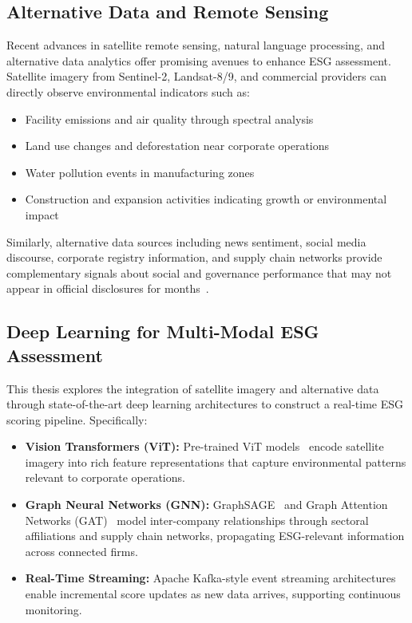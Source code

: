 \subsection{Alternative Data and Remote Sensing}

Recent advances in satellite remote sensing, natural language processing, and alternative data analytics offer promising avenues to enhance ESG assessment. Satellite imagery from Sentinel-2, Landsat-8/9, and commercial providers can directly observe environmental indicators such as:

\begin{itemize}
\item Facility emissions and air quality through spectral analysis
\item Land use changes and deforestation near corporate operations
\item Water pollution events in manufacturing zones
\item Construction and expansion activities indicating growth or environmental impact
\end{itemize}

Similarly, alternative data sources including news sentiment, social media discourse, corporate registry information, and supply chain networks provide complementary signals about social and governance performance that may not appear in official disclosures for months~\cite{li2020alternative}.

\subsection{Deep Learning for Multi-Modal ESG Assessment}

This thesis explores the integration of satellite imagery and alternative data through state-of-the-art deep learning architectures to construct a real-time ESG scoring pipeline. Specifically:

\begin{itemize}
\item \textbf{Vision Transformers (ViT):} Pre-trained ViT models~\cite{dosovitskiy2020image} encode satellite imagery into rich feature representations that capture environmental patterns relevant to corporate operations.
\item \textbf{Graph Neural Networks (GNN):} GraphSAGE~\cite{hamilton2017inductive} and Graph Attention Networks (GAT)~\cite{veličković2017graph} model inter-company relationships through sectoral affiliations and supply chain networks, propagating ESG-relevant information across connected firms.
\item \textbf{Real-Time Streaming:} Apache Kafka-style event streaming architectures enable incremental score updates as new data arrives, supporting continuous monitoring.
\end{itemize}

